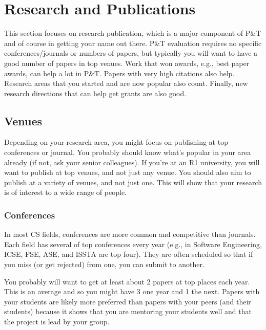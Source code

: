 \documentclass[oneside,11pt,dvipsnames]{book}
\begin{document}
\chapter{Research and Publications}\label{chap:research}

This section focuses on research publication, which is a major component of P\&T and of course in getting your name out there. P\&T evaluation requires no specific conferences/journals or numbers of papers, but typically you will want to have a good number of papers in top venues.
Work that won awards, e.g., best paper awards, can help a lot in P\&T. Papers with very high citations also help.  Research areas that you started and are now popular also count.  Finally, new research directions that can help get grants are also good.

\section{Venues}

Depending on your research area, you might focus on publishing at top conferences or journal.  You probably should know what's popular in your area already (if not, ask your senior colleagues). If you're at an R1 university, you will want to publish at top venues, and not just any venue.  You should also aim to publish at a variety of venues, and not just one.  This will show that your research is of interest to a wide range of people.

\subsection{Conferences}
In most CS fields, conferences are more common and competitive than journals. Each field has several of top conferences every year (e.g., in Software Engineering, ICSE, FSE, ASE, and ISSTA are top four).  They are often scheduled so that if you miss (or get rejected) from one, you can submit to another.

You probably will want to get at least about 2 papers at top places each year. This is an average and so you might have 3 one year and 1 the next. Papers with your students are likely more preferred than papers with your peers (and their students) because it shows that you are mentoring your students well and that the project is lead by your group.
\end{document}
